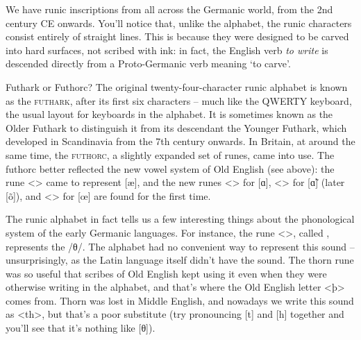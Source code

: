 \noindent We have runic inscriptions from all across the Germanic world, from the 2nd century CE onwards. You'll notice that, unlike the  alphabet, the runic characters consist entirely of straight lines. This is because they were designed to be carved into hard surfaces, not scribed with ink: in fact, the English verb \textit{to write} is descended directly from a Proto-Germanic verb meaning `to carve'.


\begin{sourcebox}{Futhark or Futhorc?}
The original twenty-four-character runic alphabet is known as the \textsc{futhark}, after its first six characters -- much like the QWERTY keyboard, the usual layout for keyboards in the  alphabet. It is sometimes known as the Older Futhark to distinguish it from its descendant the Younger Futhark, which developed in Scandinavia from the 7th century onwards. In Britain, at around the same time, the \textsc{futhorc}, a slightly expanded set of runes, came into use. The futhorc better reflected the new vowel system of Old English (see  above): the rune <\textara{\ae}> came to represent [æ], and the new runes <> for [ɑ], <> for [ɑ̃] (later [õ]), and <\textara{\oe}> for [œ] are found for the first time.
\end{sourcebox}


\noindent The runic alphabet in fact tells us a few interesting things about the phonological system of the early Germanic languages. For instance, the rune <\textarc{\th}>, called , represents the  /θ/. The  alphabet had no convenient way to represent this sound -- unsurprisingly, as the Latin language itself didn't have the sound. The thorn rune was so useful that scribes of Old English kept using it even when they were otherwise writing in the  alphabet, and that's where the Old English letter <þ> comes from. Thorn was lost in Middle English, and nowadays we write this sound as <th>, but that's a poor substitute (try pronouncing [t] and [h] together and you'll see that it's nothing like [θ]).

